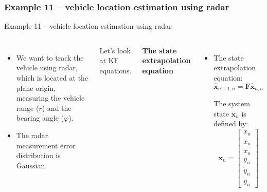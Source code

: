 \subsubsection{Example 11 – vehicle location estimation using radar}
\begin{frame}{Example 11 – vehicle location estimation using radar}
\label{Example11}
\vspace{-7pt}
\begin{columns}
\begin{itemize}
    \item We want to track the vehicle using radar, which is located at the plane origin, measuring the vehicle range ($r$) and the bearing angle ($\varphi$).
    \item The radar measurement error distribution is Gaussian. 
\end{itemize}
Let's look at KF equations.

\textbf{The state extrapolation equation}
\begin{itemize}
    \item The state extrapolation equation:
\[
\hat{\mathbf{x}}_{n+1,n} = \mathbf{F} \hat{\mathbf{x}}_{n,n}
\]

The system state \(\mathbf{x}_n\) is defined by:
\[
\mathbf{x}_n =
\begin{bmatrix}
x_n \\
\dot{x}_n \\
\ddot{x}_n \\
y_n \\
\dot{y}_n \\
\ddot{y}_n
\end{bmatrix}
\]
\end{itemize}



\end{columns}
\end{frame}
